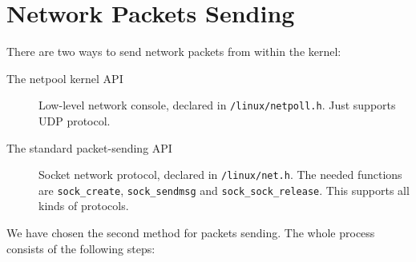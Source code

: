\section{Network Packets Sending}
There are two ways to send network packets from within the kernel:
\begin{description}
	\item[The netpool kernel API] Low-level network console, declared in \verb+/linux/netpoll.h+. Just supports UDP protocol.
	\item[The standard packet-sending API] Socket network protocol, declared in \verb+/linux/net.h+. The needed functions are \texttt{sock\_create}, \texttt{sock\_sendmsg} and \texttt{sock\_sock\_release}. This supports all kinds of protocols. 
\end{description}
We have chosen the second method for packets sending. The whole process consists of the following steps:
